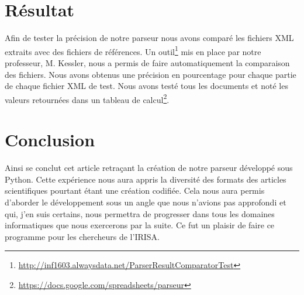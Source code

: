 \documentclass[12pt, final]{article}
\begin{document}
    \section{\fontsubtitle Résultat}
    Afin de tester la précision de notre parseur nous avons comparé les fichiers XML extraits avec des fichiers de références. Un outil\footnote{\href{http://inf1603.alwaysdata.net/ParserResultComparatorTest.php}{http://inf1603.alwaysdata.net/ParserResultComparatorTest}} mis en place par notre professeur, M. Kessler, nous a permis de faire automatiquement la comparaison des fichiers.
    \newline\newline
    Nous avons obtenus une précision en pourcentage pour chaque partie de chaque fichier XML de test. Nous avons testé tous les documents et noté les valeurs retournées dans un tableau de calcul\footnote{\href{https://docs.google.com/spreadsheets/d/1YIWf5Bg4ohN5pPNs4-5C8sWGQh3Y1UM6NhN-PYjWUQo/edit?usp=sharing}{https://docs.google.com/spreadsheets/parseur}}.
    
    \section{\fontsubtitle Conclusion}
    Ainsi se conclut cet article retraçant la création de notre parseur développé sous Python. Cette expérience nous aura appris la diversité des formats des articles scientifiques pourtant étant une création codifiée. Cela nous aura permis d'aborder le développement sous un angle que nous n'avions pas approfondi et qui, j'en suis certains, nous permettra de progresser dans tous les domaines informatiques que nous exercerons par la suite.\newline\newline
    Ce fut un plaisir de faire ce programme pour les chercheurs de l'IRISA.
    
\end{document}
